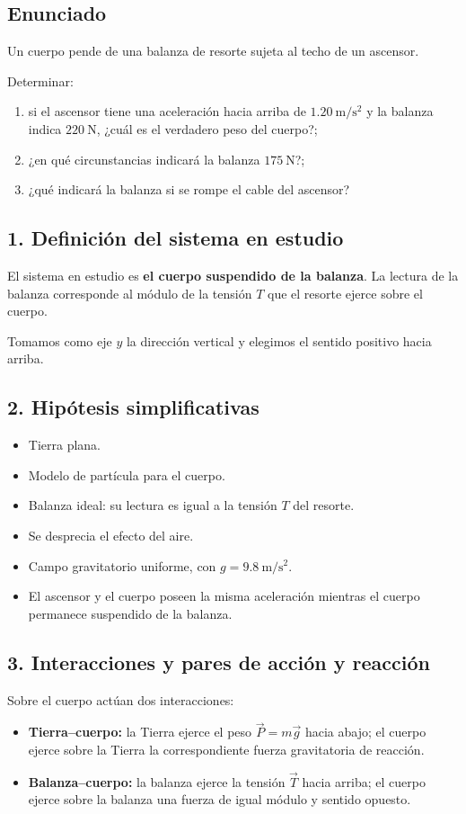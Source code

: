 \documentclass[12pt]{article}
\newcommand{\paso}[2]{%
  \subsection*{\color{AzulFisica}#1. #2}%
}
\begin{document}
\subsection*{Enunciado}
Un cuerpo pende de una balanza de resorte sujeta al techo de un ascensor.

Determinar:
\begin{enumerate}[label=\alph*)]
  \item si el ascensor tiene una aceleración hacia arriba de $\SI{1.20}{\meter\per\second\squared}$ y la balanza indica $\SI{220}{\newton}$, ¿cuál es el verdadero peso del cuerpo?;
  \item ¿en qué circunstancias indicará la balanza $\SI{175}{\newton}$?;
  \item ¿qué indicará la balanza si se rompe el cable del ascensor?
\end{enumerate}

\paso{1}{Definición del sistema en estudio}
El sistema en estudio es \textbf{el cuerpo suspendido de la balanza}. La lectura de la balanza corresponde al módulo de la tensión $T$ que el resorte ejerce sobre el cuerpo.

Tomamos como eje $y$ la dirección vertical y elegimos el sentido positivo hacia arriba.

\paso{2}{Hipótesis simplificativas}
\begin{itemize}[itemsep=2pt]
  \item Tierra plana.
  \item Modelo de partícula para el cuerpo.
  \item Balanza ideal: su lectura es igual a la tensión $T$ del resorte.
  \item Se desprecia el efecto del aire.
  \item Campo gravitatorio uniforme, con $g=\SI{9.8}{\meter\per\second\squared}$.
  \item El ascensor y el cuerpo poseen la misma aceleración mientras el cuerpo permanece suspendido de la balanza.
\end{itemize}

\paso{3}{Interacciones y pares de acción y reacción}
Sobre el cuerpo actúan dos interacciones:
\begin{itemize}[itemsep=2pt]
  \item \textbf{Tierra--cuerpo:} la Tierra ejerce el peso $\vec P=m\vec g$ hacia abajo; el cuerpo ejerce sobre la Tierra la correspondiente fuerza gravitatoria de reacción.
  \item \textbf{Balanza--cuerpo:} la balanza ejerce la tensión $\vec T$ hacia arriba; el cuerpo ejerce sobre la balanza una fuerza de igual módulo y sentido opuesto.
\end{itemize}
\end{document}
